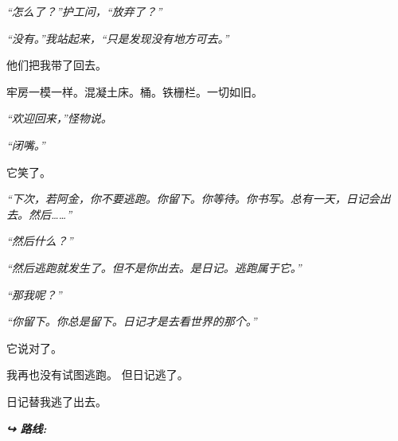 \noindent \textit{“怎么了？”护工问，“放弃了？”}

\noindent \textit{“没有。”我站起来，“只是发现没有地方可去。”}

\noindent 他们把我带了回去。

\noindent 牢房一模一样。混凝土床。桶。铁栅栏。一切如旧。

\noindent \textit{“欢迎回来，”怪物说。}

\noindent \textit{“闭嘴。”}

\noindent 它笑了。

\noindent \textit{“下次，若阿金，你不要逃跑。你留下。你等待。你书写。总有一天，日记会出去。然后……”}

\noindent \textit{“然后什么？”}

\noindent \textit{“然后逃跑就发生了。但不是你出去。是日记。逃跑属于它。”}

\noindent \textit{“那我呢？”}

\noindent \textit{“你留下。你总是留下。日记才是去看世界的那个。”}

\noindent 它说对了。

\noindent 我再也没有试图逃跑。
但日记逃了。

\noindent 日记替我逃了出去。

\vspace{0.5em}
\noindent\textit{\textbf{↪ 路线:}  \rotasep {} \rotasep {}}
